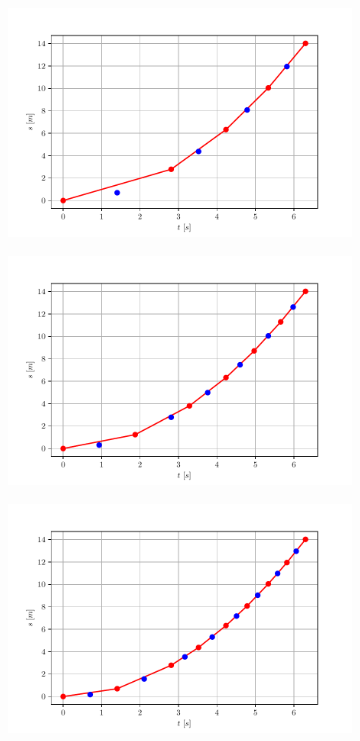 \documentclass{report} \usepackage[T1]{fontenc} \usepackage[italian]{babel}
\begin{document}
\begin{figure}[H]
\begin{subfigure}[b]{0.49\textwidth}
  \end{subfigure}
  \begin{subfigure}[b]{0.49\textwidth}
  \includegraphics[width=\textwidth]{s-t_parabola3}
  \end{subfigure}
  \begin{subfigure}[b]{0.49\textwidth}
  \includegraphics[width=\textwidth]{s-t_parabola4}
  \end{subfigure}
  \begin{subfigure}[b]{0.49\textwidth}
  \includegraphics[width=\textwidth]{s-t_parabola5}

\end{subfigure}
\end{figure}
\end{document}
